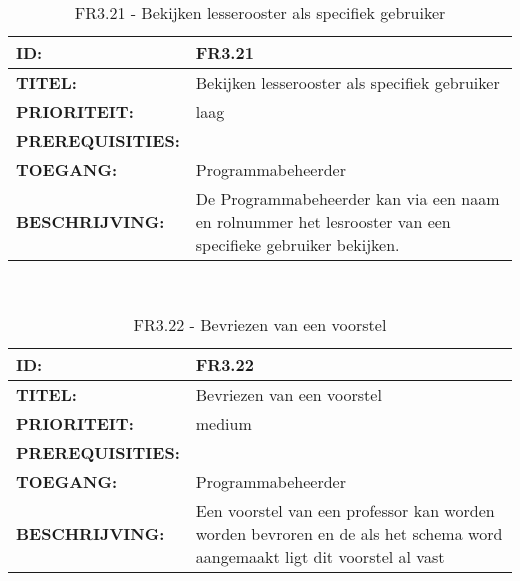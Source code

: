 \noindent\begin{table}[H]
            \begin{tabular}{l | p{10cm}}
                \textbf{ID:} & FR3.21 \\ \hline
                \textbf{TITEL:} & Bekijken lesserooster als specifiek gebruiker\\ \hline
                \textbf{PRIORITEIT:} &  laag \\ \hline
                \textbf{PREREQUISITIES:} & \\ \hline
                \textbf{TOEGANG:} & Programmabeheerder \\ \hline
                \textbf{BESCHRIJVING:} & De Programmabeheerder kan via een naam en rolnummer het lesrooster van een specifieke gebruiker bekijken. \\ 
            \end{tabular}\\
            \caption{FR3.21 - Bekijken lesserooster als specifiek gebruiker}
            \label{tab:FR3.21 - Bekijken lesserooster als specifiek gebruiker}
        \end{table}
        
\noindent\begin{table}[H]
            \begin{tabular}{l | p{10cm}}
                \textbf{ID:} & FR3.22 \\ \hline
                \textbf{TITEL:} & Bevriezen van een voorstel\\ \hline
                \textbf{PRIORITEIT:} &  medium \\ \hline
                \textbf{PREREQUISITIES:} & \\ \hline
                \textbf{TOEGANG:} & Programmabeheerder \\ \hline
                \textbf{BESCHRIJVING:} & Een voorstel van een professor kan worden worden bevroren en de als het schema word aangemaakt ligt dit voorstel al vast\\ 
            \end{tabular}\\
            \caption{FR3.22 - Bevriezen van een voorstel}
            \label{tab:FR3.22 - Bevriezen van een voorstel}
        \end{table}
        
